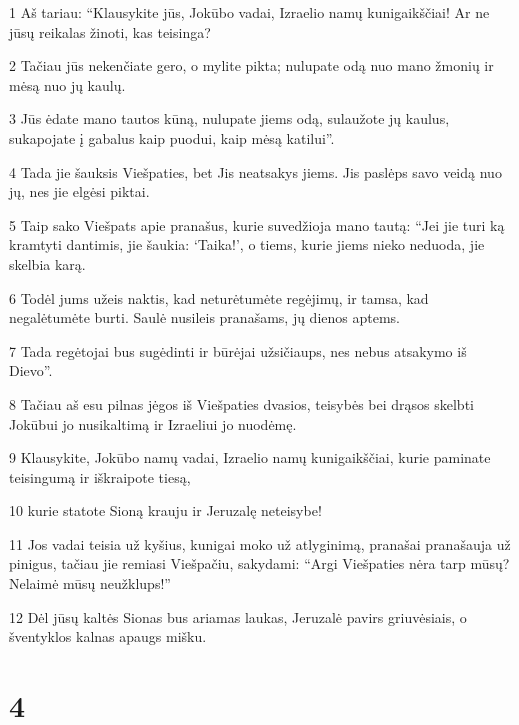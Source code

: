 \par 1 Aš tariau: “Klausykite jūs, Jokūbo vadai, Izraelio namų kunigaikščiai! Ar ne jūsų reikalas žinoti, kas teisinga? 
\par 2 Tačiau jūs nekenčiate gero, o mylite pikta; nulupate odą nuo mano žmonių ir mėsą nuo jų kaulų. 
\par 3 Jūs ėdate mano tautos kūną, nulupate jiems odą, sulaužote jų kaulus, sukapojate į gabalus kaip puodui, kaip mėsą katilui”. 
\par 4 Tada jie šauksis Viešpaties, bet Jis neatsakys jiems. Jis paslėps savo veidą nuo jų, nes jie elgėsi piktai. 
\par 5 Taip sako Viešpats apie pranašus, kurie suvedžioja mano tautą: “Jei jie turi ką kramtyti dantimis, jie šaukia: ‘Taika!’, o tiems, kurie jiems nieko neduoda, jie skelbia karą. 
\par 6 Todėl jums užeis naktis, kad neturėtumėte regėjimų, ir tamsa, kad negalėtumėte burti. Saulė nusileis pranašams, jų dienos aptems. 
\par 7 Tada regėtojai bus sugėdinti ir būrėjai užsičiaups, nes nebus atsakymo iš Dievo”. 
\par 8 Tačiau aš esu pilnas jėgos iš Viešpaties dvasios, teisybės bei drąsos skelbti Jokūbui jo nusikaltimą ir Izraeliui jo nuodėmę. 
\par 9 Klausykite, Jokūbo namų vadai, Izraelio namų kunigaikščiai, kurie paminate teisingumą ir iškraipote tiesą, 
\par 10 kurie statote Sioną krauju ir Jeruzalę neteisybe! 
\par 11 Jos vadai teisia už kyšius, kunigai moko už atlyginimą, pranašai pranašauja už pinigus, tačiau jie remiasi Viešpačiu, sakydami: “Argi Viešpaties nėra tarp mūsų? Nelaimė mūsų neužklups!” 
\par 12 Dėl jūsų kaltės Sionas bus ariamas laukas, Jeruzalė pavirs griuvėsiais, o šventyklos kalnas apaugs mišku.



\chapter{4}


